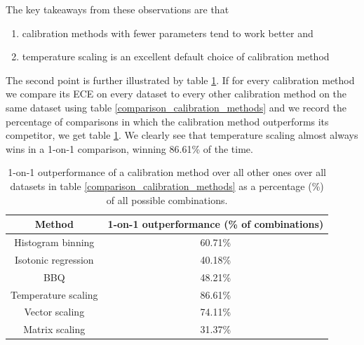 The key takeaways from these observations are that
\begin{enumerate}
  \item calibration methods with fewer parameters tend to work better and
  \item temperature scaling is an excellent default choice of calibration method
\end{enumerate}

The second point is further illustrated by table \ref{1v1_comparison_calibration_metrics}. If for every calibration method we compare its ECE on every dataset to every other calibration method on the same dataset using table \ref{comparison_calibration_methods} and we record the percentage of comparisons in which the calibration method outperforms its competitor, we get table \ref{1v1_comparison_calibration_metrics}. We clearly see that temperature scaling almost always wins in a 1-on-1 comparison, winning 86.61\% of the time.
\begin{table}
  \centering
  \label{1v1_comparison_calibration_metrics}
  \begin{tabular}{ |c|c| }
    \hline
	Method & 1-on-1 outperformance (\% of combinations) \\
	\hline
    Histogram binning & 60.71\% \\
    Isotonic regression & 40.18\% \\
    BBQ & 48.21\% \\
    Temperature scaling & 86.61\% \\
    Vector scaling & 74.11\% \\
    Matrix scaling & 31.37\% \\
    \hline
  \end{tabular}
  \caption{
  1-on-1 outperformance of a calibration method over all other ones over all datasets in table \ref{comparison_calibration_methods} as a percentage (\%) of all possible combinations.
  }
\end{table}

